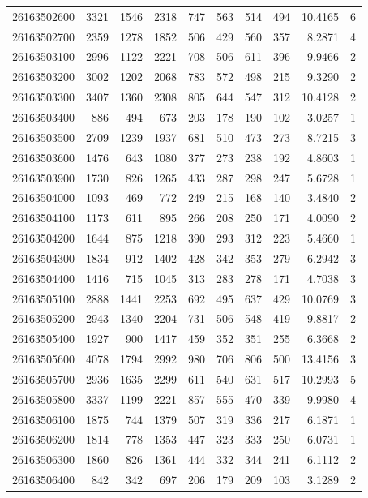 \documentclass[11pt,landscape]{article}
\begin{document}
{\begin{longtable}[]{@{}lrrrrrrrrr@{}}
26163502600 & 3321 & 1546 & 2318 & 747 & 563 & 514 & 494 & 10.4165 & 6 \\
26163502700 & 2359 & 1278 & 1852 & 506 & 429 & 560 & 357 & 8.2871 & 4 \\
26163503100 & 2996 & 1122 & 2221 & 708 & 506 & 611 & 396 & 9.9466 & 2 \\
26163503200 & 3002 & 1202 & 2068 & 783 & 572 & 498 & 215 & 9.3290 & 2 \\
26163503300 & 3407 & 1360 & 2308 & 805 & 644 & 547 & 312 & 10.4128 & 2 \\
26163503400 & 886 & 494 & 673 & 203 & 178 & 190 & 102 & 3.0257 & 1 \\
26163503500 & 2709 & 1239 & 1937 & 681 & 510 & 473 & 273 & 8.7215 & 3 \\
26163503600 & 1476 & 643 & 1080 & 377 & 273 & 238 & 192 & 4.8603 & 1 \\
26163503900 & 1730 & 826 & 1265 & 433 & 287 & 298 & 247 & 5.6728 & 1 \\
26163504000 & 1093 & 469 & 772 & 249 & 215 & 168 & 140 & 3.4840 & 2 \\
26163504100 & 1173 & 611 & 895 & 266 & 208 & 250 & 171 & 4.0090 & 2 \\
26163504200 & 1644 & 875 & 1218 & 390 & 293 & 312 & 223 & 5.4660 & 1 \\
26163504300 & 1834 & 912 & 1402 & 428 & 342 & 353 & 279 & 6.2942 & 3 \\
26163504400 & 1416 & 715 & 1045 & 313 & 283 & 278 & 171 & 4.7038 & 3 \\
26163505100 & 2888 & 1441 & 2253 & 692 & 495 & 637 & 429 & 10.0769 & 3 \\
26163505200 & 2943 & 1340 & 2204 & 731 & 506 & 548 & 419 & 9.8817 & 2 \\
26163505400 & 1927 & 900 & 1417 & 459 & 352 & 351 & 255 & 6.3668 & 2 \\
26163505600 & 4078 & 1794 & 2992 & 980 & 706 & 806 & 500 & 13.4156 & 3 \\
26163505700 & 2936 & 1635 & 2299 & 611 & 540 & 631 & 517 & 10.2993 & 5 \\
26163505800 & 3337 & 1199 & 2221 & 857 & 555 & 470 & 339 & 9.9980 & 4 \\
26163506100 & 1875 & 744 & 1379 & 507 & 319 & 336 & 217 & 6.1871 & 1 \\
26163506200 & 1814 & 778 & 1353 & 447 & 323 & 333 & 250 & 6.0731 & 1 \\
26163506300 & 1860 & 826 & 1361 & 444 & 332 & 344 & 241 & 6.1112 & 2 \\
26163506400 & 842 & 342 & 697 & 206 & 179 & 209 & 103 & 3.1289 & 2 \\

\end{longtable}}
\end{document}
